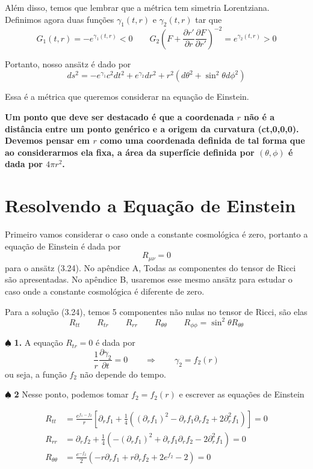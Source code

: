 \documentclass[11pt]{article}
\begin{document}
Além disso, temos que lembrar que a métrica tem simetria Lorentziana.
Definimos agora duas funções \(\gamma_1(t,r)\) e \(\gamma_2(t,r)\) tar
que \[ \tag{3.23} G_1(t,r) = - e^{\gamma_1(t,r)} < 0 \qquad 
G_2 \left( F + \frac{\partial r'}{\partial r} \frac{\partial F}{\partial r'} \right)^{-2} = e^{\gamma_2(t,r)} > 0\]

Portanto, nosso ansätz é dado por
\[ \tag{3.24} \boxed{ds^2 = - e^{\gamma_1} c^2 dt^2 + e^{\gamma_2}dr^2 + r^2 (d\theta^2 + \sin^2\theta d\phi^2)}\]

Essa é a métrica que queremos considerar na equação de Einstein.

\textbf{Um ponto que deve ser destacado é que a coordenada \(r\) não é a
distância entre um ponto genérico e a origem da curvatura (ct,0,0,0).
Devemos pensar em \(r\) como uma coordenada definida de tal forma que ao
considerarmos ela fixa, a área da superfície definida por
\((\theta, \phi)\) é dada por \(4 \pi r^2\).}

    \hypertarget{resolvendo-a-equauxe7uxe3o-de-einstein}{%
\section{Resolvendo a Equação de
Einstein}\label{resolvendo-a-equauxe7uxe3o-de-einstein}}

    Primeiro vamos considerar o caso onde a constante cosmológica é zero,
portanto a equação de Einstein é dada por \[ \tag{4.1} R_{\mu\nu} = 0 \]
para o ansätz (3.24). No apêndice A, Todas as componentes do tensor de
Ricci são apresentadas. No apêndice B, usaremos esse mesmo ansätz para
estudar o caso onde a constante cosmológica é diferente de zero.

    Para a solução (3.24), temos 5 componentes não nulas no tensor de Ricci,
são elas
\[\tag{4.2} R_{tt}\qquad R_{tr}\qquad R_{rr}\qquad R_{\theta\theta} \qquad R_{\phi\phi} = \sin^2\theta R_{\theta\theta}\]

    \(\spadesuit\) \textbf{1.} A equação \(R_{tr} = 0\) é dada por
\[\tag{4.3} \frac{1}{r}\frac{\partial \gamma_2}{\partial t} = 0 \qquad \Rightarrow \qquad \gamma_2=f_2(r)\]
ou seja, a função \(f_2\) não depende do tempo.

    \(\spadesuit\) \textbf{2} Nesse ponto, podemos tomar \(f_2 = f_2(r)\) e
escrever as equações de Einstein

\begin{align*}
R_{tt} & = \frac{e^{f_1 - f_2}}{r}\left[\partial_r f_1 + \frac{1}{4}\left( (\partial_r f_1)^2 - \partial_r f_1 \partial_r f_2 +2 \partial^2_r f_1 \right) \right] = 0 \\
\tag{4.4} R_{rr} & = \partial_r f_2 + \frac{1}{4}\left( -(\partial_r f_1)^2 + \partial_r f_1 \partial_r f_2 - 2 \partial^2_r f_1 \right) = 0 \\
R_{\theta \theta} & = \frac{e^{-f_2}}{2}\left( - r \partial_r f_1 + r \partial_r f_2 + 2 e^{f_2} - 2 \right) = 0
\end{align*}
\end{document}
